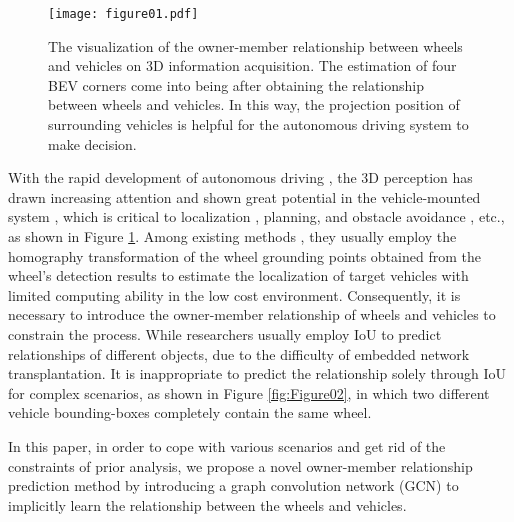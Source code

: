 \documentclass{article}
\begin{document}

% 
\begin{figure}[!t]
    \centering
    \texttt{[image: figure01.pdf]}
    \caption{The visualization of the owner-member relationship between wheels and vehicles on 3D information acquisition. The estimation of four BEV corners come into being after obtaining the relationship between wheels and vehicles. In this way, the projection position of surrounding vehicles is helpful for the autonomous driving system to make decision.}
    \label{fig:Figure01}
\end{figure}




With the rapid development of autonomous driving \cite{article13}, the 3D perception has drawn increasing attention and shown great potential in the vehicle-mounted system \cite{article14, article15}, which is critical to localization \cite{article16,  article17}, planning, and obstacle avoidance \cite{article18, article19}, etc., as shown in Figure \ref{fig:Figure01}. Among existing methods \cite{article20, article21, article22}, they usually employ the homography transformation \cite{article20} of the wheel grounding points obtained from the wheel's detection results to estimate the localization of target vehicles with limited computing ability in the low cost environment. Consequently, it is necessary to introduce the owner-member relationship of wheels and vehicles to constrain the process. While researchers usually employ IoU to predict relationships of different objects, due to the difficulty of embedded network transplantation. It is inappropriate to predict the relationship solely through IoU for complex scenarios, as shown in Figure \ref{fig:Figure02}, in which two different vehicle bounding-boxes completely contain the same wheel.

In this paper, in order to cope with various scenarios and get rid of the constraints of prior analysis, we propose a novel owner-member relationship prediction method by introducing a graph convolution network (GCN) to implicitly learn the relationship between the wheels and vehicles. 

\end{document}
